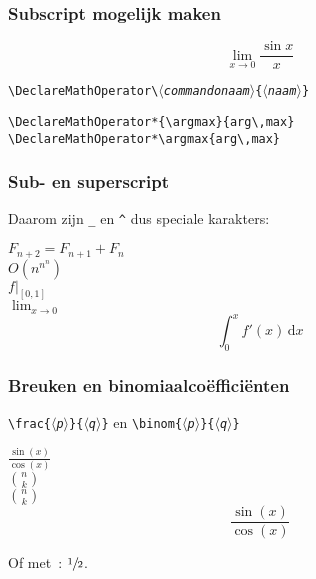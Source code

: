 \begin{frame}[fragile]
  \frametitle{Subscript mogelijk maken}

  \begin{LTXexample}
\begin{equation}
  \lim_{x\rightarrow 0}
  \frac{\sin x}{x}
\end{equation}
  \end{LTXexample}

  \texttt{\textcolor{uagreen}{\textbackslash DeclareMathOperator}\textbackslash\textsl{$\langle$commandonaam$\rangle$}\{\textsl{$\langle$naam$\rangle$}\}}
  \begin{verbatim}
\DeclareMathOperator*{\argmax}{arg\,max} 
\DeclareMathOperator*\argmax{arg\,max} 
  \end{verbatim}
\end{frame}

\begin{frame}[fragile]
  \frametitle{Sub- en superscript}

  Daarom zijn \verb|_| en \verb|^| dus speciale karakters:
  \small
  \begin{LTXexample}
$F_{n+2}=F_{n+1}+F_n$ \\
$O(n^{n^n})$ \\
$f|_{[0,1]}$ \\
$\lim_{x\rightarrow 0}$
\begin{equation}
  \int_0^x\!f'(x)\,\mathrm{d}x
\end{equation}
  \end{LTXexample}
\end{frame}

\begin{frame}[fragile]
  \frametitle{Breuken en binomiaalco\"effici\"enten}

  \texttt{\textcolor{uagreen}{\textbackslash frac}\{$\langle$\textsl{p}$\rangle$\}\{$\langle$\textsl{q}$\rangle$\}} en \texttt{\textcolor{uagreen}{\textbackslash binom}\{$\langle$\textsl{p}$\rangle$\}\{$\langle$\textsl{q}$\rangle$\}}

  \begin{LTXexample}
$\frac{\sin(x)}{\cos(x)}$ \\
$\binom{n}{k}$ \\
$\displaystyle\binom{n}{k}$
\begin{equation}
  \frac{\sin(x)}{\cos(x)}
\end{equation}
  \end{LTXexample}
  Of met~: $\sfrac{1}{2}$.
\end{frame}

